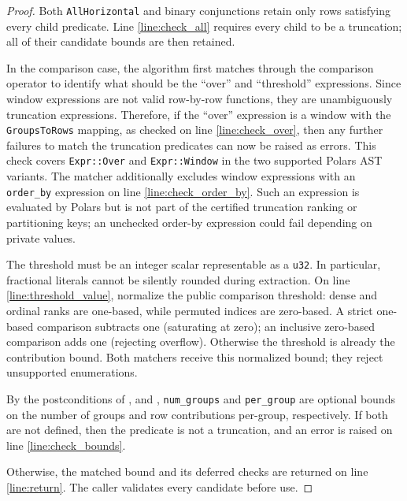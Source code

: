 \documentclass{article}
\begin{document}
\begin{proof}
    Both \texttt{AllHorizontal} and binary conjunctions retain only rows
    satisfying every child predicate. Line \ref{line:check_all} requires every
    child to be a truncation; all of their candidate bounds are then retained.

    In the comparison case, the algorithm first matches through the comparison operator
    to identify what should be the ``over'' and ``threshold'' expressions.
    Since window expressions are not valid row-by-row functions,
    they are unambiguously truncation expressions.
    Therefore, if the ``over'' expression is a window with the
    \texttt{GroupsToRows} mapping, as checked on line \ref{line:check_over},
    then any further failures to match the truncation predicates can now be raised as errors.
    This check covers \texttt{Expr::Over} and \texttt{Expr::Window}
    in the two supported Polars AST variants.
    The matcher additionally excludes window expressions with an \texttt{order\_by}
    expression on line \ref{line:check_order_by}. Such an expression is evaluated by
    Polars but is not part of the certified truncation ranking or partitioning keys;
    an unchecked order-by expression could fail depending on private values.

    The threshold must be an integer scalar representable as a \texttt{u32}.
    In particular, fractional literals cannot be silently rounded during extraction.
    On line \ref{line:threshold_value}, normalize the public comparison threshold:
    dense and ordinal ranks are one-based, while permuted indices are zero-based.
    A strict one-based comparison subtracts one (saturating at zero);
    an inclusive zero-based comparison adds one (rejecting overflow).
    Otherwise the threshold is already the contribution bound.
    Both matchers receive this normalized bound; they reject unsupported enumerations.

    By the postconditions of ,
    and ,
    \texttt{num\_groups} and \texttt{per\_group} are optional bounds on the number of groups and row contributions per-group, respectively.
    If both are not defined, then the predicate is not a truncation,
    and an error is raised on line \ref{line:check_bounds}.

    Otherwise, the matched bound and its deferred checks are returned on line \ref{line:return}.
    The caller validates every candidate before use.
\end{proof}
\end{document}

